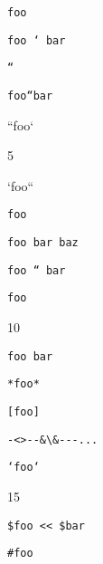 
\def\mytitle{Code Spans}


\texttt{foo}

\texttt{foo ` bar}

\texttt{``}

\texttt{foo``bar}

``foo`

5

`foo``

\texttt{foo}

\texttt{foo   bar
baz}

\texttt{foo `` bar}

\texttt{foo}

10

\texttt{foo   bar}

\texttt{*foo*}

\texttt{[foo]}

\texttt{-<>-{}-\&\textbackslash{}\&-{}-{}-...}

\texttt{`foo`}

15

\texttt{\$foo << \$bar}

\texttt{\#foo}



